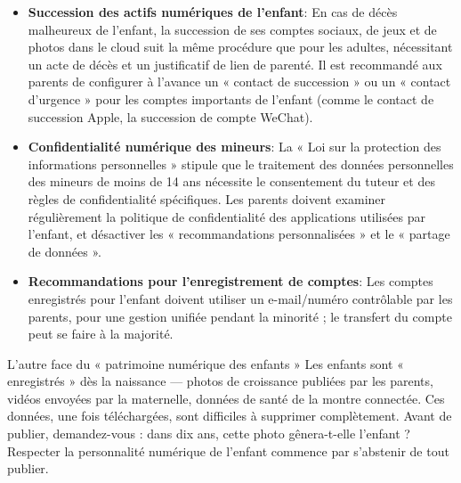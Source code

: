 \begin{itemize}
  \item \textbf{Succession des actifs numériques de l'enfant}: En cas de décès malheureux de l'enfant, la succession de ses comptes sociaux, de jeux et de photos dans le cloud suit la même procédure que pour les adultes, nécessitant un acte de décès et un justificatif de lien de parenté. Il est recommandé aux parents de configurer à l'avance un « contact de succession » ou un « contact d'urgence » pour les comptes importants de l'enfant (comme le contact de succession Apple, la succession de compte WeChat).
  \item \textbf{Confidentialité numérique des mineurs}: La « Loi sur la protection des informations personnelles » stipule que le traitement des données personnelles des mineurs de moins de 14 ans nécessite le consentement du tuteur et des règles de confidentialité spécifiques. Les parents doivent examiner régulièrement la politique de confidentialité des applications utilisées par l'enfant, et désactiver les « recommandations personnalisées » et le « partage de données ».
  \item \textbf{Recommandations pour l'enregistrement de comptes}: Les comptes enregistrés pour l'enfant doivent utiliser un e-mail/numéro contrôlable par les parents, pour une gestion unifiée pendant la minorité ; le transfert du compte peut se faire à la majorité.
\end{itemize}

\begin{tcbwarn}{L'autre face du « patrimoine numérique des enfants »}
Les enfants sont « enregistrés » dès la naissance — photos de croissance publiées par les parents, vidéos envoyées par la maternelle, données de santé de la montre connectée. Ces données, une fois téléchargées, sont difficiles à supprimer complètement. Avant de publier, demandez-vous : dans dix ans, cette photo gênera-t-elle l'enfant ? Respecter la personnalité numérique de l'enfant commence par s'abstenir de tout publier.

\end{tcbwarn}

